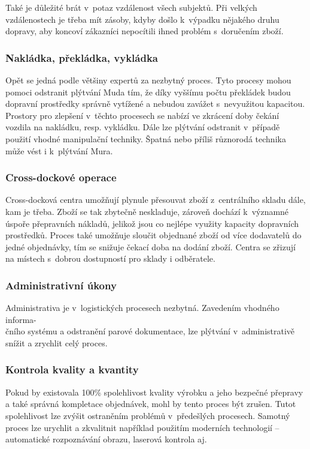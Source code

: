 Také je důležité brát v~potaz vzdálenost všech subjektů. Při velkých vzdálenostech je třeba mít zásoby, kdyby došlo k~výpadku nějakého druhu dopravy, aby koncoví zákazníci nepocítili ihned problém s~doručením zboží.

\subsubsection*{Nakládka, překládka, vykládka}

Opět se jedná podle většiny expertů za nezbytný proces. Tyto procesy mohou pomoci odstranit plýtvání Muda tím, že díky vyššímu počtu překládek budou dopravní prostředky správně vytížené a nebudou zavážet s~nevyužitou kapacitou. Prostory pro zlepšení v~těchto procesech se nabízí ve zkrácení doby čekání vozdila na nakládku, resp. vykládku. Dále lze plýtvání odstranit v~případě použití vhodné manipulační techniky. Špatná nebo příliš různorodá technika může vést i k~plýtvání Mura.

\subsubsection*{Cross-dockové operace}

Cross-docková centra umožňují plynule přesouvat zboží z~centrálního skladu dále, kam je třeba. Zboží se tak zbytečně neskladuje, zároveň dochází k~významné úspoře přepravních nákladů, jelikož jsou co nejlépe využity kapacity dopravních prostředků. Proces také umožňuje sloučit objednané zboží od více dodavatelů do jedné objednávky, tím se snižuje čekací doba na dodání zboží. Centra se zřizují na místech s~dobrou dostupností pro sklady i odběratele.

\subsubsection*{Administrativní úkony}

Administrativa je v~logistických procesech nezbytná. Zavedením vhodného informa-\\čního systému a odstranění parové dokumentace, lze plýtvání v~administrativě snížit a zrychlit celý proces. 

\subsubsection*{Kontrola kvality a kvantity}

Pokud by existovala 100\% spolehlivost kvality výrobku a jeho bezpečné přepravy a také správná kompletace objednávek, mohl by tento proces být zrušen. Tutot spolehlivost lze zvýšit ostraněním problémů v~předešlých procesech. Samotný proces lze urychlit a zkvalitnit například použitím moderních technologií -- automatické rozpoznávání obrazu, laserová kontrola aj.

